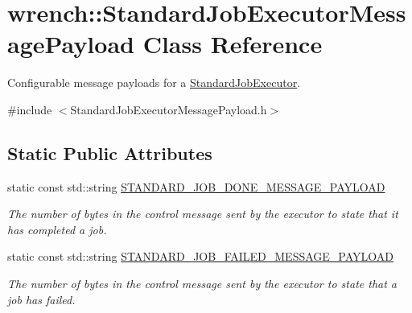 \hypertarget{classwrench_1_1_standard_job_executor_message_payload}{}\section{wrench\+:\+:Standard\+Job\+Executor\+Message\+Payload Class Reference}
\label{classwrench_1_1_standard_job_executor_message_payload}


Configurable message payloads for a \hyperlink{classwrench_1_1_standard_job_executor}{Standard\+Job\+Executor}.  




{\ttfamily \#include $<$Standard\+Job\+Executor\+Message\+Payload.\+h$>$}

\subsection*{Static Public Attributes}
\begin{DoxyCompactItemize}
\item 
\mbox{\label{classwrench_1_1_standard_job_executor_message_payload_a70624f111b00520237a8b5bde88d977a}} 
static const std\+::string \hyperlink{classwrench_1_1_standard_job_executor_message_payload_a70624f111b00520237a8b5bde88d977a}{S\+T\+A\+N\+D\+A\+R\+D\+\_\+\+J\+O\+B\+\_\+\+D\+O\+N\+E\+\_\+\+M\+E\+S\+S\+A\+G\+E\+\_\+\+P\+A\+Y\+L\+O\+AD}
\begin{DoxyCompactList}\small\item\em The number of bytes in the control message sent by the executor to state that it has completed a job. \end{DoxyCompactList}\item 
\mbox{\label{classwrench_1_1_standard_job_executor_message_payload_a64c84913aae6554e5e2aae38e9b129fe}} 
static const std\+::string \hyperlink{classwrench_1_1_standard_job_executor_message_payload_a64c84913aae6554e5e2aae38e9b129fe}{S\+T\+A\+N\+D\+A\+R\+D\+\_\+\+J\+O\+B\+\_\+\+F\+A\+I\+L\+E\+D\+\_\+\+M\+E\+S\+S\+A\+G\+E\+\_\+\+P\+A\+Y\+L\+O\+AD}
\begin{DoxyCompactList}\small\item\em The number of bytes in the control message sent by the executor to state that a job has failed. \end{DoxyCompactList}\end{DoxyCompactItemize}


